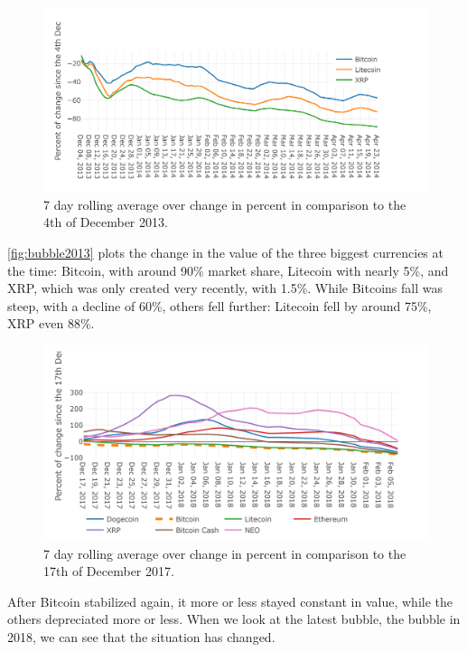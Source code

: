 \documentclass[11pt,a4paper,compsoc,conference]{IEEEtran}
\begin{document}
\begin{figure}[ht]
    \centering
    \includegraphics[width=\linewidth]{figures/diagram-20200618.png}
    \caption[Change in value after the 2013 Bubble]{7 day rolling average over change in percent in comparison to the 4th of December 2013.}
    \label{fig:bubble2013}
\end{figure}

\autoref{fig:bubble2013} plots the change in the value of the three biggest currencies at the time: Bitcoin, with around 90\% market share, Litecoin with nearly 5\%, and XRP, which was only created very recently, with 1.5\%. While Bitcoins fall was steep, with a decline of 60\%, others fell further: Litecoin fell by around 75\%, XRP even 88\%.

\begin{figure}
    \centering
    \includegraphics[width=\linewidth]{figures/diagram-20200618 (3).png}
    \caption[Change in value after the 2018 Bubble]{7 day rolling average over change in percent in comparison to the 17th of December 2017.}
    \label{fig:bubble2017}
\end{figure}

After Bitcoin stabilized again, it more or less stayed constant in value, while the others depreciated more or less. When we look at the latest bubble, the bubble in 2018, we can see that the situation has changed. 
\end{document}
